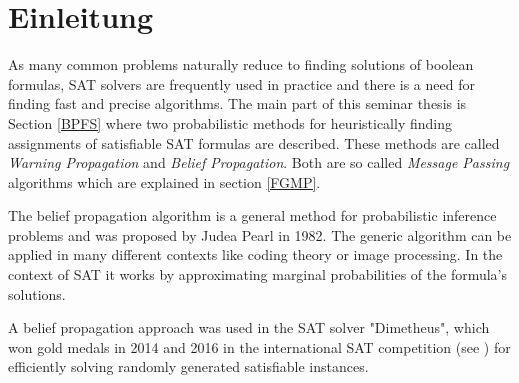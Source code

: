 \chapter{Einleitung}

As many common problems naturally reduce to finding solutions of boolean formulas, SAT solvers are frequently used in practice and there is a need for finding fast and precise algorithms.  
The main part of this seminar thesis is Section \ref{BPFS} where two probabilistic methods for heuristically finding assignments of satisfiable SAT formulas are described. These methods are called \emph{Warning Propagation} and \emph{Belief Propagation}. Both are so called \emph{Message Passing} algorithms which are explained in section \ref{FGMP}.

The belief propagation algorithm is a general method for probabilistic inference problems and was proposed by Judea Pearl in 1982. The generic algorithm can be applied in many different contexts like coding theory or image processing. In the context of SAT it works by approximating marginal probabilities of the formula's solutions.

A belief propagation approach was used in the SAT solver "Dimetheus", which won gold medals in 2014 and 2016 in the international SAT competition (see \cite{satcomp}) for efficiently solving randomly generated satisfiable instances.
